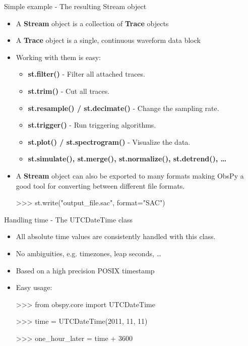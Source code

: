 \documentclass[handout]{beamer}
\begin{document}
\begin{frame}[plain]{Simple example - The resulting Stream object}
 \begin{itemize}
     \item A \textbf{Stream} object is a collection of \textbf{Trace} objects
     \item A \textbf{Trace} object is a single, continuous waveform data block
     \item Working with them is easy:
         \begin{itemize}
             \item \textbf{st.filter()} - Filter all attached traces.
             \item \textbf{st.trim()} - Cut all traces.
             \item \textbf{st.resample() / st.decimate()} - Change the sampling rate.
             \item \textbf{st.trigger()} - Run triggering algorithms.
             \item \textbf{st.plot() / st.spectrogram()} - Visualize the data.
             \item \textbf{st.simulate(), st.merge(), st.normalize(), st.detrend(), \dots}
         \end{itemize}
     \item A \textbf{Stream} object can also be exported to many formats making ObsPy a good tool for converting between different file formats.
\begin{myColorBox}{0.8}{}
\begin{semiverbatim}
>>> st.write("output\_file.sac", format="SAC")
\end{semiverbatim}
\end{myColorBox}
\end{itemize}

\end{frame}


\begin{frame}[plain]{Handling time - The UTCDateTime class}
    \begin{itemize}
        \item All absolute time values are consistently handled with this class.
        \item No ambiguities, e.g. timezones, leap seconds, \dots
        \item Based on a high precision POSIX timestamp
        \item Easy usage:
\begin{myColorBox}{0.8}{}
\begin{semiverbatim}
>>> from obspy.core import UTCDateTime

>>> time = UTCDateTime(2011, 11, 11)

>>> one\_hour\_later = time + 3600

\end{semiverbatim}
\end{myColorBox}
    \end{itemize}

\end{frame}
\end{document}
